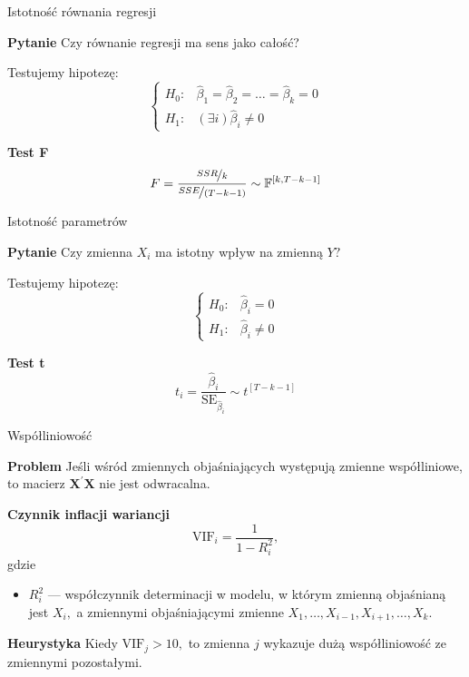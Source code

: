 \documentclass[a4paper, 11pt]{beamer}
\begin{document}
	\begin{frame}{Istotność równania regresji}
		\begin{block}{\textbf{Pytanie}}
			Czy równanie regresji ma sens jako całość?
		\end{block}
		
		Testujemy hipotezę: \[
			\begin{cases}
				H_{0}: & \hat{\beta}_1 = \hat{\beta}_2 = \ldots = \hat{\beta}_k = 0\\
				H_{1}: & \left(\exists i\right) \hat{\beta}_i \neq 0
			\end{cases}
		\]
		
		\begin{block}{\textbf{Test F}}
			\[
				F=\frac{\nicefrac{SSR}{k}}{\nicefrac{SSE}{\left(T-k-1\right)}} \sim \mathbb{F}^{\left[k, T-k-1\right]}
			\]
		\end{block}
	\end{frame}
	
	\begin{frame}{Istotność parametrów}
		\begin{block}{\textbf{Pytanie}}
			Czy zmienna $X_i$ ma istotny wpływ na zmienną $Y?$
		\end{block}
		
		Testujemy hipotezę: \[
			\begin{cases}
				H_{0}: & \hat{\beta}_i = 0\\
				H_{1}: & \hat{\beta}_i \neq 0
			\end{cases}
		\]
		
		\begin{block}{\textbf{Test t}} \[
			t_i = \frac{\hat{\beta}_i}{\mbox{SE}_{\hat{\beta}_{i}}} \sim t^{\left[T-k-1\right]}
		\]
		\end{block}
	\end{frame}
	
	\begin{frame}{Współliniowość}
		
		\begin{alert}{\textbf{Problem}}
			Jeśli wśród zmiennych objaśniających występują zmienne współliniowe,
			to macierz $\boldsymbol{X}^{\prime}\boldsymbol{X}$ nie jest odwracalna.
		\end{alert}
		
		\begin{block}{\textbf{Czynnik inflacji wariancji}}
			\[
				\mbox{VIF}_i = \frac{1}{1 - R^2_i},
			\]
			gdzie
			\begin{itemize}
				\item $R^2_i$ --- współczynnik determinacji w modelu,
					w którym zmienną objaśnianą jest $X_i,$ a zmiennymi objaśniającymi
					zmienne $X_1, \ldots, X_{i-1}, X_{i+1}, \ldots, X_k.$
			\end{itemize}
		\end{block}
		\begin{alert}{\textbf{Heurystyka}}
			Kiedy $\mbox{VIF}_j > 10,$ to zmienna $j$ wykazuje dużą współliniowość ze zmiennymi pozostałymi.
		\end{alert}
		
	\end{frame}
\end{document}
